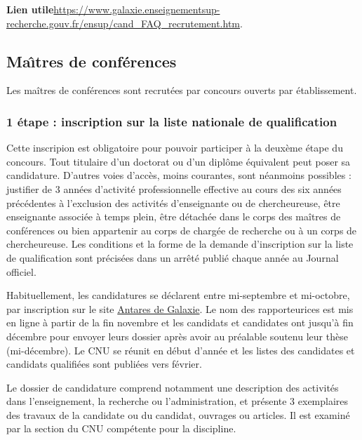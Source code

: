 \textbf{Lien utile\hspace{.5em}}\url{https://www.galaxie.enseignementsup-recherche.gouv.fr/ensup/cand_FAQ_recrutement.htm}.

\subsection{Ma\^\i tres de conf\'erences}

Les ma\^itres de conf\'erences sont recrut\'e\mp e\mp s par concours ouverts par \'etablissement.

\subsubsection*{1\iere{} \'etape : inscription sur la liste nationale de qualification}

Cette inscripion est obligatoire pour pouvoir participer \`a la
deux\`eme \'etape du concours. Tout titulaire d'un doctorat ou d'un
dipl\^ome \'equivalent peut poser sa candidature. D'autres voies
d'acc\`es, moins courantes, sont n\'eanmoins possibles : justifier de
3 ann\'ees d'activit\'e professionnelle effective au cours des six
ann\'ees pr\'ec\'edentes \`a l'exclusion des activit\'es
d'enseignant\mp e ou de chercheur\mp euse, \^etre enseignant\mp e associ\'e\mp e \`a temps
plein, \^etre d\'etach\'e\mp e dans le corps des ma\^itres de
conf\'erences ou bien appartenir au corps de charg\'e\mp e de recherche
ou \`a un corps de chercheur\mp euse. Les conditions et la forme de la
demande d'inscription sur la liste de qualification sont
pr\'ecis\'ees dans un arr\^et\'e publi\'e chaque ann\'ee au Journal
officiel.

Habituellement, les candidatures se d\'eclarent entre mi-septembre et mi-octobre, 
par inscription sur le site \href{https://galaxie.enseignementsup-recherche.gouv.fr/antares/can/index.jsp}{Antares de Galaxie}.
Le nom des rapporteur\mp ice\mp s est mis en ligne \`a partir de la fin novembre et 
les candidats et candidates ont jusqu'\`a fin d\'ecembre pour envoyer leurs dossier apr\`es avoir au pr\'ealable soutenu
leur th\`ese (mi-d\'ecembre).
Le CNU se r\'eunit en d\'ebut d'ann\'ee et les listes des candidates et candidats qualifi\'e\mp e\mp s sont publi\'ees vers f\'evrier.

Le dossier de candidature comprend notamment une
description des activit\'es dans l'enseignement, la recherche ou
l'administration, et pr\'esente 3 exemplaires des travaux de la candidate ou du candidat,
ouvrages ou articles. Il est examin\'e par la section du CNU
comp\'etente pour la discipline. 

